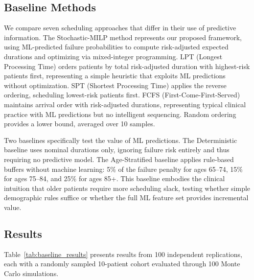 \documentclass[msom,blindrev]{informs3}
\begin{document}
\subsection{Baseline Methods}
\label{sec:baselines}

We compare seven scheduling approaches that differ in their use of predictive information. The Stochastic-MILP method represents our proposed framework, using ML-predicted failure probabilities to compute risk-adjusted expected durations and optimizing via mixed-integer programming. LPT (Longest Processing Time) orders patients by total risk-adjusted duration with highest-risk patients first, representing a simple heuristic that exploits ML predictions without optimization. SPT (Shortest Processing Time) applies the reverse ordering, scheduling lowest-risk patients first. FCFS (First-Come-First-Served) maintains arrival order with risk-adjusted durations, representing typical clinical practice with ML predictions but no intelligent sequencing. Random ordering provides a lower bound, averaged over 10 samples.

Two baselines specifically test the value of ML predictions. The Deterministic baseline uses nominal durations only, ignoring failure risk entirely and thus requiring no predictive model. The Age-Stratified baseline applies rule-based buffers without machine learning: 5\% of the failure penalty for ages 65--74, 15\% for ages 75--84, and 25\% for ages 85+. This baseline embodies the clinical intuition that older patients require more scheduling slack, testing whether simple demographic rules suffice or whether the full ML feature set provides incremental value.

\subsection{Results}
\label{sec:results}

Table~\ref{tab:baseline_results} presents results from 100 independent replications, each with a randomly sampled 10-patient cohort evaluated through 100 Monte Carlo simulations.
\end{document}
